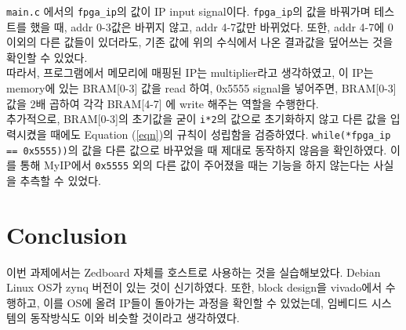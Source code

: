 \documentclass{article}
\begin{document}
\texttt{main.c} 에서의 \texttt{fpga\_ip}의 값이 IP input signal이다. \texttt{fpga\_ip}의 값을 바꿔가며 테스트를 했을 때, addr 0-3값은 바뀌지 않고, addr 4-7값만 바뀌었다. 또한, addr 4-7에 0이외의 다른 값들이 있더라도, 기존 값에 위의 수식에서 나온 결과값을 덮어쓰는 것을 확인할 수 있었다. \\

따라서, 프로그램에서 메모리에 매핑된 IP는  multiplier라고 생각하였고, 이 IP는 memory에 있는 BRAM[0-3] 값을 read 하여, 0x5555 signal을 넣어주면, BRAM[0-3] 값을 2배 곱하여 각각 BRAM[4-7] 에 write 해주는 역할을 수행한다. \\

추가적으로, BRAM[0-3]의 초기값을 굳이 \texttt{i*2}의 값으로 초기화하지 않고 다른 값을 입력시켰을 때에도 Equation (\ref{eqn})의 규칙이 성립함을 검증하였다. \texttt{while(*fpga\_ip == 0x5555))}의 값을 다른 값으로 바꾸었을 때 제대로 동작하지 않음을 확인하였다. 이를 통해 MyIP에서 \texttt{0x5555} 외의 다른 값이 주어졌을 때는 기능을 하지 않는다는 사실을 추측할 수 있었다.

\section{Conclusion}
이번 과제에서는 Zedboard 자체를 호스트로 사용하는 것을 실습해보았다. Debian Linux OS가 zynq 버전이 있는 것이 신기하였다. 또한, block design을 vivado에서 수행하고, 이를 OS에 올려 IP들이 돌아가는 과정을 확인할 수 있었는데, 임베디드 시스템의 동작방식도 이와 비슷할 것이라고 생각하였다.



\end{document}
